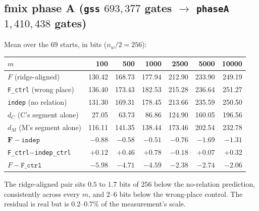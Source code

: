 \documentclass[11pt]{article}
\newcommand{\code}[1]{\texttt{#1}}
\begin{document}
\subsection{fmix phase A (\code{gss} $693{,}377$ gates $\to$ \code{phaseA} $1{,}410{,}438$ gates)}
Mean over the $69$ starts, in bits ($n_w/2=256$):
\begin{center}\small
\begin{tabular}{@{}lrrrrrr@{}}
\toprule
$m$ & 100 & 500 & 1000 & 2500 & 5000 & 10000 \\
\midrule
$F$ (ridge-aligned)      & 130.42 & 168.73 & 177.94 & 212.90 & 233.90 & 249.19 \\
\code{F\_ctrl} (wrong place) & 136.40 & 173.43 & 182.53 & 215.28 & 236.64 & 251.27 \\
\code{indep} (no relation)   & 131.30 & 169.31 & 178.45 & 213.66 & 235.59 & 250.50 \\
$d_C$ (C's segment alone)    & 27.05 & 63.73 & 86.86 & 124.90 & 160.05 & 196.56 \\
$d_M$ (M's segment alone)    & 116.11 & 141.35 & 138.44 & 173.46 & 202.54 & 232.78 \\
\midrule
$\mathbf{F-\code{indep}}$ & $\mathbf{-0.88}$ & $\mathbf{-0.58}$ & $\mathbf{-0.51}$ & $\mathbf{-0.76}$ & $\mathbf{-1.69}$ & $\mathbf{-1.31}$ \\
\code{F\_ctrl}$-$\code{indep\_ctrl} & $+0.12$ & $+0.46$ & $+0.78$ & $-0.18$ & $+0.07$ & $+0.32$ \\
$F-\code{F\_ctrl}$ & $-5.98$ & $-4.71$ & $-4.59$ & $-2.38$ & $-2.74$ & $-2.06$ \\
\bottomrule
\end{tabular}
\end{center}
The ridge-aligned pair sits $0.5$ to $1.7$ bits of $256$ below the no-relation prediction, consistently
across every $m$, and $2$--$6$ bits below the wrong-place control. The residual is real but is
$0.2$--$0.7\%$ of the measurement's scale.
\end{document}
